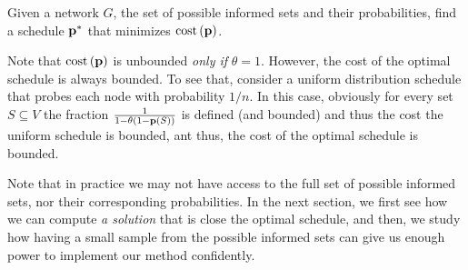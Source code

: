 \begin{definition}
 Given a network $G$, the set of possible informed sets and their probabilities, find a schedule $\mathbf{p}^*$ that minimizes $\text{cost}\left( \mathbf{p} \right)$.
 \end{definition}

Note that $\text{cost}\left( \mathbf{p} \right)$ is unbounded \emph{only if} $\theta = 1$. However, the cost of the optimal schedule is always bounded. To see that, consider a uniform distribution schedule that probes each node with probability $1/n$. In this case, obviously for every set $S\subseteq V$ the fraction $\frac{1}{1-\theta(1-\mathbf{p}(S))}$ is defined (and bounded) and thus the cost the uniform schedule is bounded, ant thus, the cost of the optimal schedule is bounded.

Note that in practice we may not have access to the full set of possible informed sets, nor their corresponding probabilities. In the next section, we first see how we can compute \emph{a solution} that is close the optimal schedule, and then, we study how having a small sample from the possible informed sets can give us enough power to implement our method confidently. 

